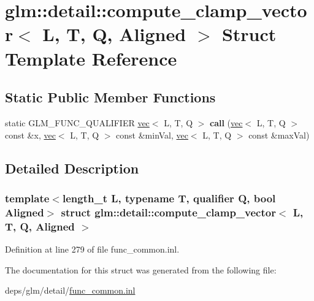 \hypertarget{structglm_1_1detail_1_1compute__clamp__vector}{}\section{glm\+:\+:detail\+:\+:compute\+\_\+clamp\+\_\+vector$<$ L, T, Q, Aligned $>$ Struct Template Reference}
\label{structglm_1_1detail_1_1compute__clamp__vector}
\subsection*{Static Public Member Functions}
\begin{DoxyCompactItemize}
\item 
\mbox{\label{structglm_1_1detail_1_1compute__clamp__vector_a19b42e5fd410e11d2318498e84658562}} 
static G\+L\+M\+\_\+\+F\+U\+N\+C\+\_\+\+Q\+U\+A\+L\+I\+F\+I\+ER \hyperlink{structglm_1_1vec}{vec}$<$ L, T, Q $>$ {\bfseries call} (\hyperlink{structglm_1_1vec}{vec}$<$ L, T, Q $>$ const \&x, \hyperlink{structglm_1_1vec}{vec}$<$ L, T, Q $>$ const \&min\+Val, \hyperlink{structglm_1_1vec}{vec}$<$ L, T, Q $>$ const \&max\+Val)
\end{DoxyCompactItemize}


\subsection{Detailed Description}
\subsubsection*{template$<$length\+\_\+t L, typename T, qualifier Q, bool Aligned$>$\newline
struct glm\+::detail\+::compute\+\_\+clamp\+\_\+vector$<$ L, T, Q, Aligned $>$}



Definition at line 279 of file func\+\_\+common.\+inl.



The documentation for this struct was generated from the following file\+:\begin{DoxyCompactItemize}
\item 
deps/glm/detail/\hyperlink{func__common_8inl}{func\+\_\+common.\+inl}\end{DoxyCompactItemize}
